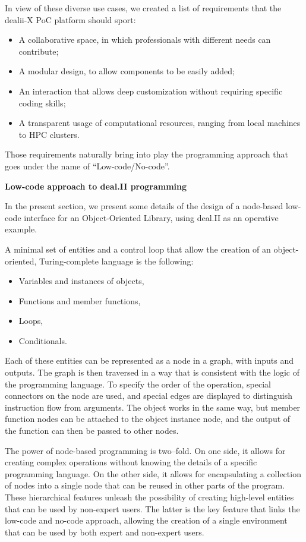 \documentclass[a4paper,12pt, numbers]{article}
\begin{document}
In view of these diverse use cases, we created a list of requirements that the dealii-X PoC platform should sport:
\begin{itemize}
\item A collaborative space, in which professionals with different needs can contribute;
\item A modular design, to allow components to be easily added;
\item An interaction that allows deep customization without requiring specific coding skills;
\item A transparent usage of computational resources, ranging from local machines to HPC clusters.
\end{itemize}

Those requirements naturally bring into play the programming approach that goes under the name of ``Low-code/No-code''.


\noindent\textbf{Low-code approach to deal.II programming}

In the present section, we present some details of the design of a node-based low-code interface for an Object-Oriented Library, using deal.II as an operative example.

A minimal set of entities and a control loop that allow the creation of an object-oriented, Turing-complete language is the following:
\begin{itemize}
\item Variables and instances of objects,
\item Functions and member functions,
\item Loops,
\item Conditionals.
\end{itemize}

Each of these entities can be represented as a node in a graph, with inputs and outputs. The graph is then traversed in a way that is consistent with the logic of the programming language. To specify the order of the operation, special connectors on the node are used, and special edges are displayed to distinguish instruction flow from arguments. The object works in the same way, but member function nodes can be attached to the object instance node, and the output of the function can then be passed to other nodes.

The power of node-based programming is two--fold. On one side, it allows for creating complex operations without knowing the details of a specific programming language. On the other side, it allows for encapsulating a collection of nodes into a single node that can be reused in other parts of the program. These hierarchical features unleash the possibility of creating high-level entities that can be used by non-expert users. The latter is the key feature that links the low-code and no-code approach, allowing the creation of a single environment that can be used by both expert and non-expert users.
\end{document}
